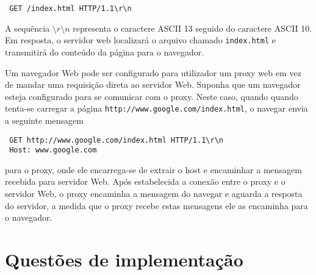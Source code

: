 \documentclass{SBCbookchapter}
\begin{document}
\begin{verbatim}
 GET /index.html HTTP/1.1\r\n
\end{verbatim}

A sequência $\setminus r\setminus n$ representa o caractere ASCII 13 seguido do caractere ASCII 10. Em resposta, o servidor web localizará o arquivo chamado {\tt index.html} e transmitirá do conteúdo da página para o navegador.

Um navegador Web pode ser configurado para utilizador um proxy web em vez de mandar uma requisição direta ao servidor Web. Suponha que um navegador esteja configurado para se comunicar com o proxy. Neste caso, quando quando tenta-se carregar a página {\tt http://www.google.com/index.html}, o navegar envia a seguinte mensagem

\begin{verbatim}
 GET http://www.google.com/index.html HTTP/1.1\r\n
 Host: www.google.com
\end{verbatim}

para o proxy, onde ele encarrega-se de extrair o host e encaminhar a mensagem recebida para servidor Web. Após estabelecida a conexão entre o proxy e o servidor Web, o proxy encaminha a mensagem do navegar e aguarda a resposta do servidor, a medida que o proxy recebe estas mensagens ele as encaminha para o navegador.

\section{Questões de implementação}
\end{document}
